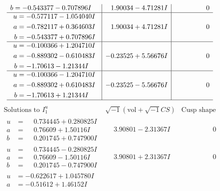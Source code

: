\documentclass[1p]{elsarticle_modified}
\theoremstyle{definition}
\newcommand{\I}{\sqrt{-1}}
\begin{document}
$$\begin{array}{c|c|c}
\begin{aligned}
b &= -0.543377 - 0.707896 I\end{aligned}
 & \phantom{-}1.90034 - 4.71281 I & \phantom{-0.000000 } 0 \\ \hline\begin{aligned}
u &= -0.577117 - 1.054040 I \\
a &= -0.782117 + 0.364603 I \\
b &= -0.543377 + 0.707896 I\end{aligned}
 & \phantom{-}1.90034 + 4.71281 I & \phantom{-0.000000 } 0 \\ \hline\begin{aligned}
u &= -0.100366 + 1.204710 I \\
a &= -0.889302 - 0.610483 I \\
b &= -1.70613 - 1.21344 I\end{aligned}
 & -0.23525 + 5.56676 I & \phantom{-0.000000 } 0 \\ \hline\begin{aligned}
u &= -0.100366 - 1.204710 I \\
a &= -0.889302 + 0.610483 I \\
b &= -1.70613 + 1.21344 I\end{aligned}
 & -0.23525 - 5.56676 I & \phantom{-0.000000 } 0\\
 \hline 
 \end{array}$$\newpage$$\begin{array}{c|c|c}  
\text{Solutions to }I^u_{1}& \I (\text{vol} + \sqrt{-1}CS) & \text{Cusp shape}\\
 \hline 
\begin{aligned}
u &= \phantom{-}0.734445 + 0.280825 I \\
a &= \phantom{-}0.76609 + 1.50116 I \\
b &= \phantom{-}0.201745 + 0.747900 I\end{aligned}
 & \phantom{-}3.90801 - 2.31367 I & \phantom{-0.000000 } 0 \\ \hline\begin{aligned}
u &= \phantom{-}0.734445 - 0.280825 I \\
a &= \phantom{-}0.76609 - 1.50116 I \\
b &= \phantom{-}0.201745 - 0.747900 I\end{aligned}
 & \phantom{-}3.90801 + 2.31367 I & \phantom{-0.000000 } 0 \\ \hline\begin{aligned}
u &= -0.622617 + 1.045780 I \\
a &= -0.51612 + 1.46152 I \\

\end{aligned}
\end{array}$$
\end{document}
